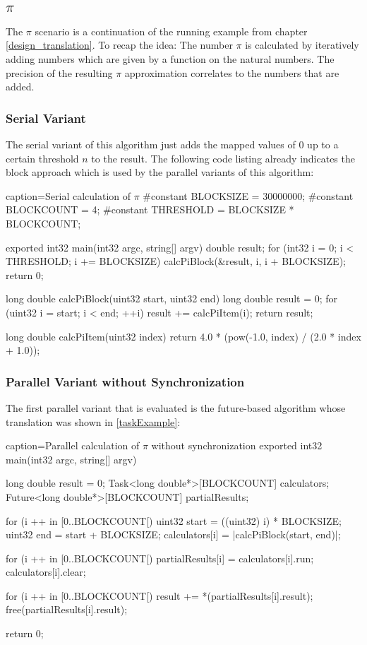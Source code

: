 \subsection{$\pi$}
The $\pi$ scenario is a continuation of the running example from chapter \ref{design_translation}. To recap the idea: The number $\pi$ is calculated by iteratively adding numbers which are given by a function on the natural numbers. The precision of the resulting $\pi$ approximation correlates to the numbers that are added. 

\subsubsection{Serial Variant}
The serial variant of this algorithm just adds the mapped values of $0$ up to a certain threshold $n$ to the result. The following code listing already indicates the block approach which is used by the parallel variants of this algorithm:

\begin{ccode}{caption=Serial calculation of $\pi$}
#constant BLOCKSIZE = 30000000; 
#constant BLOCKCOUNT = 4; 
#constant THRESHOLD = BLOCKSIZE * BLOCKCOUNT;

exported int32 main(int32 argc, string[] argv) { 
  double result;   
  for (int32 i = 0; i < THRESHOLD; i += BLOCKSIZE) { 
    calcPiBlock(&result, i, i + BLOCKSIZE); 
  }   
  return 0; 
}

long double calcPiBlock(uint32 start, uint32 end) { 
  long double result = 0; 
  for (uint32 i = start; i < end; ++i) { result += calcPiItem(i); }
  return result; 
}
 
long double calcPiItem(uint32 index) { 
  return 4.0 * (pow(-1.0, index) / (2.0 * index + 1.0)); 
}
\end{ccode}

\subsubsection{Parallel Variant without Synchronization}
\label{nonSyncPi}
The first parallel variant that is evaluated is the future-based algorithm whose translation was shown in \ref{taskExample}:
\begin{ccode}{caption=Parallel calculation of $\pi$ without synchronization}
exported int32 main(int32 argc, string[] argv) { 
  long double result = 0; 
  Task<long double*>[BLOCKCOUNT] calculators; 
  Future<long double*>[BLOCKCOUNT] partialResults; 
   
  for (i ++ in [0..BLOCKCOUNT[) { 
    uint32 start = ((uint32) i) * BLOCKSIZE; 
    uint32 end = start + BLOCKSIZE; 
    calculators[i] = |calcPiBlock(start, end)|; 
  }
   
  for (i ++ in [0..BLOCKCOUNT[) { 
    partialResults[i] = calculators[i].run; 
    calculators[i].clear; 
  }
   
  for (i ++ in [0..BLOCKCOUNT[) { 
    result += *(partialResults[i].result); 
    free(partialResults[i].result); 
  }
   
  return 0; 
}
\end{ccode}

